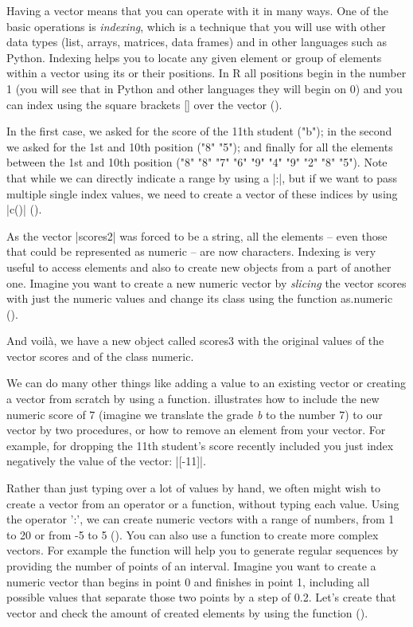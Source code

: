 Having a vector means that you can operate with it in many ways. One of the
basic operations is \emph{indexing}, which is a technique that you will use with
other data types (list, arrays, matrices, data frames) and in other
languages such as Python.  Indexing helps you to locate any given
element or group of elements within a vector using its or their
positions. In R all positions begin in the number 1 (you will see that
in Python and other languages they will begin on 0) and you can index
using the square brackets [] over the vector ().


In the first case, we asked for the score of the 11th student ("b");
in the second we asked for the 1st and 10th position ("8" "5"); and
finally for all the elements between the 1st and 10th position ("8"
"8" "7" "6" "9" "4" "9" "2" "8" "5"). Note that while we can directly
indicate a range by using a |:|, but if we want to pass multiple
single index values, we need to create a vector of these indices by
using |c()| ().

As the vector |scores2| was forced to be a string, all the elements --
even those that could be represented as numeric -- are now
characters. Indexing is very useful to access elements and also to
create new objects from a part of another one. Imagine you want to
create a new numeric vector by \emph{slicing} the vector scores with
just the numeric values and change its class using the function
as.numeric ().

And voilà, we have a new object called scores3 with the original
values of the vector scores and of the class numeric.


We can do many other things like adding a value to an existing vector
or creating a vector from scratch by using a
function.  illustrates how to include the new numeric
score of 7 (imagine we translate the grade \emph{b} to the number 7)
to our vector by two procedures, or how to remove an element from your
vector. For example, for dropping the 11th student's score recently included you
just index negatively the value of the vector: |[-11]|.

Rather than just typing over a lot of values by hand, we often might
wish to create a vector from an operator or a function, without typing
each value. Using the operator ':', we can create numeric vectors with
a range of numbers, from 1 to 20 or from -5 to 5 ().
You can also use a function to create more complex vectors. For
example the function  will help you to generate regular sequences
by providing the number of points of an interval.  Imagine you want to
create a numeric vector than begins in point 0 and finishes in point
1, including all possible values that separate those two points by a
step of 0.2. Let's create that vector and check the amount of created
elements by using the function  ().


